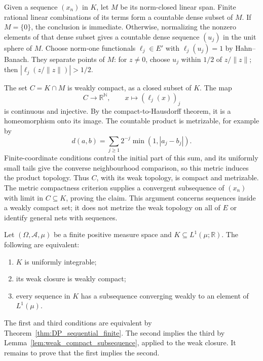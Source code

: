Given a sequence $(x_n)$ in $K$, let $M$ be its norm-closed linear span.
Finite rational linear combinations of its terms form a countable dense
subset of $M$. If $M=\{0\}$, the conclusion is immediate. Otherwise,
normalizing the nonzero elements of that dense subset gives a countable
dense sequence $(u_j)$ in the unit sphere of $M$. Choose norm-one
functionals $\ell_j\in E'$ with $\ell_j(u_j)=1$ by Hahn--Banach.
They separate points of $M$: for $z\ne0$, choose $u_j$ within $1/2$ of
$z/\|z\|$; then $|\ell_j(z/\|z\|)|>1/2$.

The set $C=K\cap M$ is weakly compact, as a closed subset of $K$.
The map
\[
C\longrightarrow\mathbb R^{\mathbb N},\qquad
x\longmapsto(\ell_j(x))_j
\]
is continuous and injective. By the compact-to-Hausdorff theorem,
it is a homeomorphism onto its image. The countable product is
metrizable, for example by
\[
d(a,b)=\sum_{j\geq1}2^{-j}\min(1,|a_j-b_j|).
\]
Finite-coordinate conditions control the initial part of this sum,
and its uniformly small tails give the converse neighbourhood
comparison, so this metric induces the product topology.
Thus $C$, with its weak topology, is compact and metrizable. The metric
compactness criterion supplies a convergent subsequence of $(x_n)$
with limit in $C\subseteq K$, proving the claim. This argument concerns
sequences inside a weakly compact set; it does not metrize the weak
topology on all of $E$ or identify general nets with sequences.
\Done

\begin{theorem}
\label{thm:DP_weak_compact_finite}
Let $(\Omega,\mathcal A,\mu)$ be a finite positive measure space and
$K\subseteq L^1(\mu;\mathbb R)$. The following are equivalent:
\begin{enumerate}
\item $K$ is uniformly integrable;
\item its weak closure is weakly compact;
\item every sequence in $K$ has a subsequence converging weakly to an
      element of $L^1(\mu)$.
\end{enumerate}
\end{theorem}
\Proof
The first and third conditions are equivalent by
Theorem~\ref{thm:DP_sequential_finite}. The second implies the third by
Lemma~\ref{lem:weak_compact_subsequence}, applied to the weak closure.
It remains to prove that the first implies the second.

